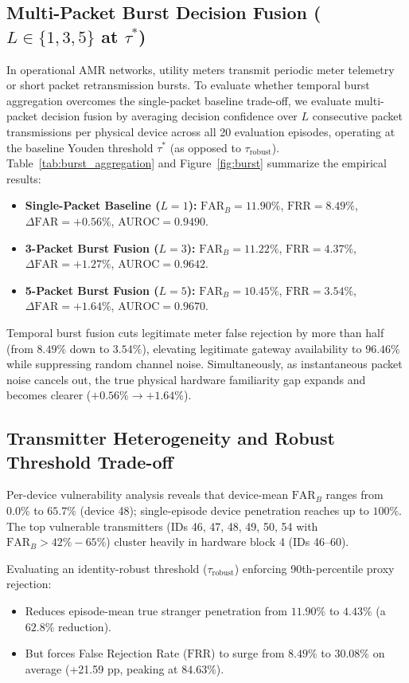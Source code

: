 \documentclass[conference]{IEEEtran}
\begin{document}
\subsection{Multi-Packet Burst Decision Fusion ($L \in \{1, 3, 5\}$ at $\tau^*$)}
In operational AMR networks, utility meters transmit periodic meter telemetry or short packet retransmission bursts. To evaluate whether temporal burst aggregation overcomes the single-packet baseline trade-off, we evaluate multi-packet decision fusion by averaging decision confidence over $L$ consecutive packet transmissions per physical device across all 20 evaluation episodes, operating at the baseline Youden threshold $\tau^*$ (as opposed to $\tau_{\text{robust}}$). Table~\ref{tab:burst_aggregation} and Figure~\ref{fig:burst} summarize the empirical results:

\begin{itemize}
    \item \textbf{Single-Packet Baseline ($L=1$):} $\text{FAR}_B = 11.90\%$, $\text{FRR} = 8.49\%$, $\Delta\text{FAR} = +0.56\%$, $\text{AUROC} = 0.9490$.
    \item \textbf{3-Packet Burst Fusion ($L=3$):} $\text{FAR}_B = 11.22\%$, $\text{FRR} = 4.37\%$, $\Delta\text{FAR} = +1.27\%$, $\text{AUROC} = 0.9642$.
    \item \textbf{5-Packet Burst Fusion ($L=5$):} $\text{FAR}_B = 10.45\%$, $\text{FRR} = 3.54\%$, $\Delta\text{FAR} = +1.64\%$, $\text{AUROC} = 0.9670$.
\end{itemize}
Temporal burst fusion cuts legitimate meter false rejection by more than half (from $8.49\%$ down to $3.54\%$), elevating legitimate gateway availability to $96.46\%$ while suppressing random channel noise. Simultaneously, as instantaneous packet noise cancels out, the true physical hardware familiarity gap expands and becomes clearer ($+0.56\% \to +1.64\%$).

\subsection{Transmitter Heterogeneity and Robust Threshold Trade-off}
Per-device vulnerability analysis reveals that device-mean $\text{FAR}_B$ ranges from $0.0\%$ to $65.7\%$ (device 48); single-episode device penetration reaches up to $100\%$. The top vulnerable transmitters (IDs 46, 47, 48, 49, 50, 54 with $\text{FAR}_B > 42\% - 65\%$) cluster heavily in hardware block 4 (IDs 46--60).

Evaluating an identity-robust threshold ($\tau_{\text{robust}}$) enforcing 90th-percentile proxy rejection:
\begin{itemize}
    \item Reduces episode-mean true stranger penetration from $11.90\%$ to $4.43\%$ (a $62.8\%$ reduction).
    \item But forces False Rejection Rate ($\text{FRR}$) to surge from $8.49\%$ to $30.08\%$ on average (+21.59 pp, peaking at $84.63\%$).
\end{itemize}
\end{document}
